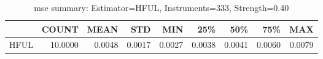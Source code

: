\begin{table}[ht]
\centering
\caption{mse summary: Estimator=HFUL, Instruments=333, Strength=0.40}
\begin{tabular}{lrrrrrrrr}
\toprule
 & COUNT & MEAN & STD & MIN & 25\% & 50\% & 75\% & MAX \\
\midrule
HFUL & 10.0000 & 0.0048 & 0.0017 & 0.0027 & 0.0038 & 0.0041 & 0.0060 & 0.0079 \\
\bottomrule
\end{tabular}
\end{table}
